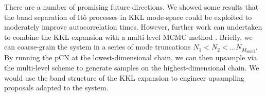 There are a number of promising future directions. We showed some results that the band separation of It\^{o} processes in KKL mode-space could be exploited to moderately improve autocorrelation times. However, further work can undertaken to combine the KKL expansion with a multi-level MCMC method \citep{gilesMultilevelMonteCarlo2008, dodwellHierarchicalMultilevelMarkov2015, jansenMultilevelMonteCarlo2020, rohrbachMultilevelSimulationHardsphere2022}. Briefly, we can coarse-grain the system in a series of mode truncations $N_1 < N_2 < \dots N_{M_\text{multi}}$. By running the pCN at the lowest-dimensional chain, we can then upsample via the multi-level scheme to generate samples on the highest-dimensional chain. We would use the band structure of the KKL expansion to engineer upsampling proposals adapted to the system.

